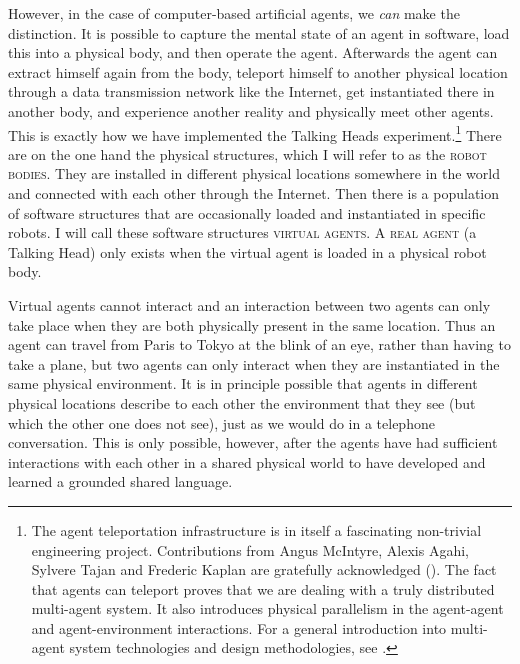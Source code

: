 \enlargethispage{1\baselineskip}

However, in the case of computer-based 
artificial agents, we {\itshape can} 
make the distinction. It is possible to capture the mental state
of an agent in software, load this into a physical 
body, and then operate 
the agent. Afterwards the agent can extract himself
again from the body, teleport himself 
to another physical location through a data transmission network
like the Internet, get instantiated there in another
body, and experience another reality and physically meet
other agents. This is exactly how we have implemented the 
Talking Heads experiment.\footnote{The agent teleportation infrastructure is in itself a 
fascinating non-trivial engineering project. Contributions 
from Angus McIntyre, Alexis Agahi, Sylvere Tajan and
Frederic Kaplan are gratefully acknowledged (\citealt{McIntyre:1999}). 
The fact that agents can teleport proves that we are dealing 
with a truly distributed multi-agent system. It also 
introduces physical parallelism in the agent-agent and 
agent-environment interactions. 
For a general introduction into multi-agent system
technologies and design methodologies, 
see \cite{Ferber:1999}.}
There are on the one hand
the physical structures, which I will refer to as the {\scshape
robot bodies}. They are installed in different physical 
locations somewhere in the world and connected
with each other through the Internet. Then there is 
a population of software structures that 
are occasionally loaded and instantiated in specific
robots. I will call these software structures
{\scshape virtual agents}. 
A {\scshape real agent} (a Talking Head) 
only exists when the virtual agent is
loaded in a physical robot body. 

Virtual agents cannot interact and 
an interaction between two  agents
can only take place when they are both physically present
in the same location. Thus an agent can travel from
Paris to Tokyo at the blink of an eye, rather than having
to take a plane, but two agents can only interact when they
are instantiated in the same physical environment. 
It is in principle possible that agents in different 
physical locations describe to each other the environment that they 
see (but which the other one does not see), just as we 
would do in a telephone conversation. This is only possible,
however, after the agents have had sufficient interactions
with each other in a shared physical world to have 
developed and learned a grounded shared language. 

